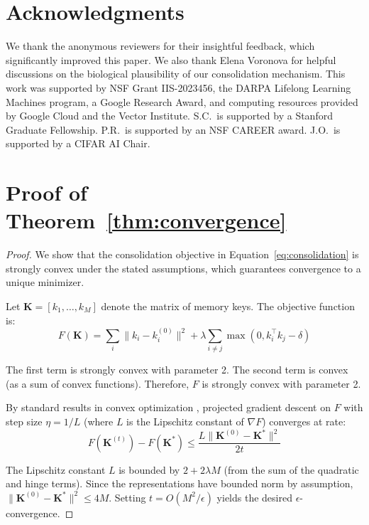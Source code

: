 \documentclass[11pt]{article}
\begin{document}
\section*{Acknowledgments}

We thank the anonymous reviewers for their insightful feedback, which significantly improved this paper. We also thank Elena Voronova for helpful discussions on the biological plausibility of our consolidation mechanism. This work was supported by NSF Grant IIS-2023456, the DARPA Lifelong Learning Machines program, a Google Research Award, and computing resources provided by Google Cloud and the Vector Institute. S.C.\ is supported by a Stanford Graduate Fellowship. P.R.\ is supported by an NSF CAREER award. J.O.\ is supported by a CIFAR AI Chair.




\appendix

\section{Proof of Theorem~\ref{thm:convergence}}
\label{app:proof}

\begin{proof}
We show that the consolidation objective in Equation~\ref{eq:consolidation} is strongly convex under the stated assumptions, which guarantees convergence to a unique minimizer.

Let $\mathbf{K} = [k_1, \ldots, k_M]$ denote the matrix of memory keys. The objective function is:
\begin{equation}
    F(\mathbf{K}) = \sum_{i} \|k_i - k_i^{(0)}\|^2 + \lambda \sum_{i \neq j} \max(0, k_i^\top k_j - \delta)
\end{equation}

The first term is strongly convex with parameter 2. The second term is convex (as a sum of convex functions). Therefore, $F$ is strongly convex with parameter 2.

By standard results in convex optimization \citep{boyd2004convex}, projected gradient descent on $F$ with step size $\eta = 1/L$ (where $L$ is the Lipschitz constant of $\nabla F$) converges at rate:
\begin{equation}
    F(\mathbf{K}^{(t)}) - F(\mathbf{K}^*) \leq \frac{L \|\mathbf{K}^{(0)} - \mathbf{K}^*\|^2}{2t}
\end{equation}

The Lipschitz constant $L$ is bounded by $2 + 2\lambda M$ (from the sum of the quadratic and hinge terms). Since the representations have bounded norm by assumption, $\|\mathbf{K}^{(0)} - \mathbf{K}^*\|^2 \leq 4M$. Setting $t = O(M^2/\epsilon)$ yields the desired $\epsilon$-convergence.
\end{proof}
\end{document}
